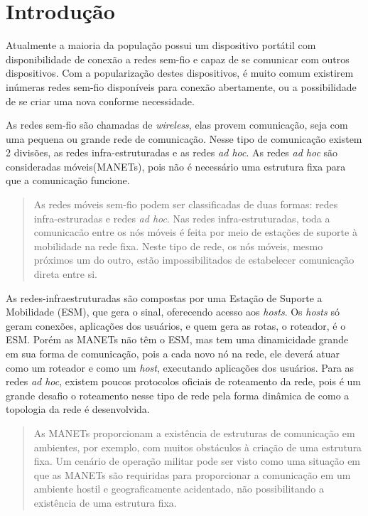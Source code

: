\section{Introdu\c{c}\~ao} 
Atualmente a maioria da popula\c{c}\~ao possui um dispositivo port\'atil com disponibilidade de conex\~ao a redes sem-fio e capaz de se comunicar com outros dispositivos. 
Com a populariza\c{c}\~ao destes dispositivos, \'e muito comum existirem in\'umeras redes sem-fio dispon\'iveis para conex\~ao abertamente, ou a possibilidade de se criar uma nova conforme necessidade.

As redes sem-fio s\~ao chamadas de \textit{wireless}, elas provem comunica\c{c}\~ao, seja com uma pequena ou grande rede de comunica\c{c}\~ao. 
Nesse tipo de comunica\c{c}\~ao existem 2 divis\~oes, as redes infra-estruturadas e as redes \textit{ad hoc}. 
As redes \textit{ad hoc} s\~ao consideradas m\'oveis(MANETs), pois n\~ao \'e necess\'ario uma estrutura fixa para que a comunica\c{c}\~ao funcione.

\begin{quote}
As redes m\'oveis sem-fio podem ser classificadas de duas formas: redes infra-estruradas e redes \textit{ad hoc}. 
Nas redes infra-estruturadas, toda a comunicac\~ao entre os n\'os m\'oveis \'e feita por meio de esta\c{c}\~oes de suporte \`a mobilidade na rede fixa. 
Neste tipo de rede, os n\'os m\'oveis, mesmo pr\'oximos um do outro, est\~ao impossibilitados de estabelecer comunica\c{c}\~ao direta entre si.\cite{pepe}
\end{quote}

As redes-infraestruturadas s\~ao compostas por uma Esta\c{c}\~ao de Suporte a Mobilidade (ESM), que gera o sinal, oferecendo acesso aos \textit{hosts}. 
Os \textit{hosts} s\'o geram conex\~oes, aplica\c{c}\~oes dos usu\'arios, e quem gera as rotas, o roteador, \'e o ESM. 
Por\'em as MANETs n\~ao t\^em o ESM, mas tem uma dinamicidade grande em sua forma de comunica\c{c}\~ao, pois a cada novo n\'o na rede, ele dever\'a atuar como um roteador e como um \textit{host}, executando aplica\c{c}\~oes dos usu\'arios. 
Para as redes \textit{ad hoc}, existem poucos protocolos oficiais de roteamento da rede, pois \'e um grande desafio o roteamento nesse tipo de rede pela forma din\^ amica de como a topologia da rede \'e desenvolvida.

\begin{quote}
As MANETs proporcionam a exist\^encia de estruturas de comunica\c{c}\~ao em ambientes, por exemplo, com muitos obst\'aculos \`a cria\c{c}\~ao de uma estrutura fixa. Um cen\'ario de opera\c{c}\~ao militar pode ser visto como uma situa\c{c}\~ao em que as MANETs s\~ao requiridas para proporcionar a comunica\c{c}\~ao em um ambiente hostil e geograficamente acidentado, n\~ao possibilitando a exist\^encia de uma estrutura fixa.\cite{schimidt}
\end{quote}

